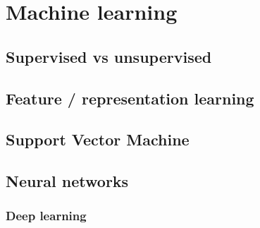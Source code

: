\documentclass[a4paper,12pt,twoside]{report}
\begin{document}
\chapter{Machine learning}

\section{Supervised vs unsupervised}

\section{Feature / representation learning}

\section{Support Vector Machine}

\section{Neural networks}

\subsection{Deep learning}
\end{document}

